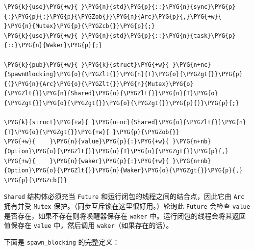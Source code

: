 \begin{Verbatim}[commandchars=\\\{\},breaklines=true,breakanywhere=true,fontsize=\codefont,xleftmargin=17bp]
\PYG{k}{use}\PYG{+w}{ }\PYG{n}{std}\PYG{p}{::}\PYG{n}{sync}\PYG{p}{:}\PYG{p}{:}\PYG{p}{\PYGZob{}}\PYG{n}{Arc}\PYG{p}{,}\PYG{+w}{ }\PYG{n}{Mutex}\PYG{p}{\PYGZcb{}}\PYG{p}{;}
\PYG{k}{use}\PYG{+w}{ }\PYG{n}{std}\PYG{p}{::}\PYG{n}{task}\PYG{p}{::}\PYG{n}{Waker}\PYG{p}{;}

\PYG{k}{pub}\PYG{+w}{ }\PYG{k}{struct}\PYG{+w}{ }\PYG{n+nc}{SpawnBlocking}\PYG{o}{\PYGZlt{}}\PYG{n}{T}\PYG{o}{\PYGZgt{}}\PYG{p}{(}\PYG{n}{Arc}\PYG{o}{\PYGZlt{}}\PYG{n}{Mutex}\PYG{o}{\PYGZlt{}}\PYG{n}{Shared}\PYG{o}{\PYGZlt{}}\PYG{n}{T}\PYG{o}{\PYGZgt{}}\PYG{o}{\PYGZgt{}}\PYG{o}{\PYGZgt{}}\PYG{p}{)}\PYG{p}{;}

\PYG{k}{struct}\PYG{+w}{ }\PYG{n+nc}{Shared}\PYG{o}{\PYGZlt{}}\PYG{n}{T}\PYG{o}{\PYGZgt{}}\PYG{+w}{ }\PYG{p}{\PYGZob{}}
\PYG{+w}{    }\PYG{n}{value}\PYG{p}{:}\PYG{+w}{ }\PYG{n+nb}{Option}\PYG{o}{\PYGZlt{}}\PYG{n}{T}\PYG{o}{\PYGZgt{}}\PYG{p}{,}
\PYG{+w}{    }\PYG{n}{waker}\PYG{p}{:}\PYG{+w}{ }\PYG{n+nb}{Option}\PYG{o}{\PYGZlt{}}\PYG{n}{Waker}\PYG{o}{\PYGZgt{}}\PYG{p}{,}
\PYG{p}{\PYGZcb{}}
\end{Verbatim}

\texttt{Shared} 结构体必须充当 \texttt{Future} 和运行闭包的线程之间的结合点，因此它由 \texttt{Arc} 拥有并受 \texttt{Mutex} 保护。（同步互斥锁在这里很好用。）轮询此 \texttt{Future} 会检查 \texttt{value} 是否存在，如果不存在则将唤醒器保存在 \texttt{waker} 中。运行闭包的线程会将其返回值保存在 \texttt{value} 中，然后调用 \texttt{waker}（如果存在的话）。

下面是 \texttt{spawn\_blocking} 的完整定义：

